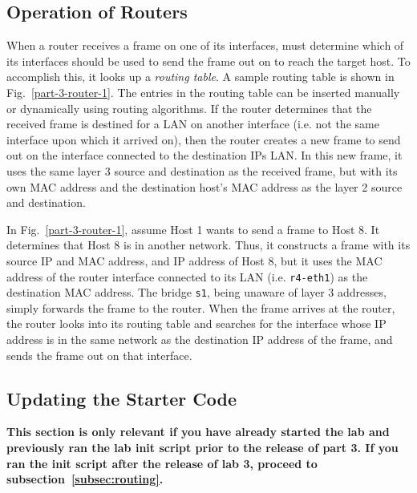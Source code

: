 \documentclass[11pt]{article}
\begin{document}
\subsection{Operation of Routers}
\label{subsec:logic-routers}
When a router receives a frame on one of its interfaces, must determine which of its interfaces should be used to send the frame out on to reach the target host.
To accomplish this, it looks up a \textit{routing table}. A sample routing table is shown in Fig.~\ref{part-3-router-1}.
The entries in the routing table can be inserted manually or dynamically using routing algorithms.
If the router determines that the received frame is destined for a LAN on another interface (i.e. not the same interface upon which it arrived on), then the router creates a new frame to send out on the interface connected to the destination IPs LAN.
In this new frame, it uses the same layer 3 source and destination as the received frame, but with its own MAC address and the destination host's MAC address as the layer 2 source and destination.



In Fig.~\ref{part-3-router-1}, assume Host 1 wants to send a frame to Host 8. It determines that Host 8 is in another network.
Thus, it constructs a frame with its source IP and MAC address, and IP address of Host 8, but it uses the MAC address of the router interface connected to its LAN (i.e. \texttt{r4-eth1}) as the destination MAC address. The bridge \texttt{s1}, being unaware of layer 3 addresses, simply forwards the frame to the router.
When the frame arrives at the router, the router looks into its routing table and searches for the interface whose IP address is in the same network as the destination IP address of the frame, and sends the frame out on that interface.

\subsection{Updating the Starter Code}
\label{subsec:update-starter-code}
\textbf{This section is only relevant if you have already started the lab and previously ran the lab init script prior to the release of part 3. If you ran the init script after the release of lab 3, proceed to subsection~\ref{subsec:routing}.}
\end{document}
